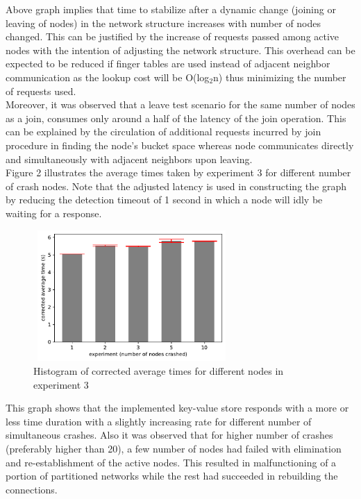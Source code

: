 \documentclass[
    a4paper,
    twocolumn,
]{article}
\begin{document}
Above graph implies that time to stabilize after a dynamic change (joining or leaving of nodes) in the network structure increases with number of nodes changed. This can be justified by the increase of requests passed among active nodes with the intention of adjusting the network structure. This overhead can be expected to be reduced if finger tables are used instead of adjacent neighbor communication as the lookup cost will be O(log$_2$n) thus minimizing the number of requests used.\\

Moreover, it was observed that a leave test scenario for the same number of nodes as a join, consumes only around a half of the latency of the join operation. This can be explained by the circulation of additional requests incurred by join procedure in finding the node's bucket space whereas node communicates directly and simultaneously with adjacent neighbors upon leaving.\\

Figure 2 illustrates the average times taken by experiment 3 for different number of crash nodes. Note that the adjusted latency is used in constructing the graph by reducing the detection timeout of 1 second in which a node will idly be waiting for a response.\\

\setlength{\intextsep}{10pt plus 2pt minus 0pt}
\begin{figure}[!ht]
	\centering
	\includegraphics[width=7.5cm, height=5cm]{crash_bar.pdf}
	\caption{Histogram of corrected average times for different nodes in experiment 3}
\end{figure}

This graph shows that the implemented key-value store responds with a more or less time duration with a slightly increasing rate for different number of simultaneous crashes. Also it was observed that for higher number of crashes (preferably higher than 20), a few number of nodes had failed with elimination and re-establishment of the active nodes. This resulted in malfunctioning of a portion of partitioned networks while the rest had succeeded in rebuilding the connections.
\end{document}
